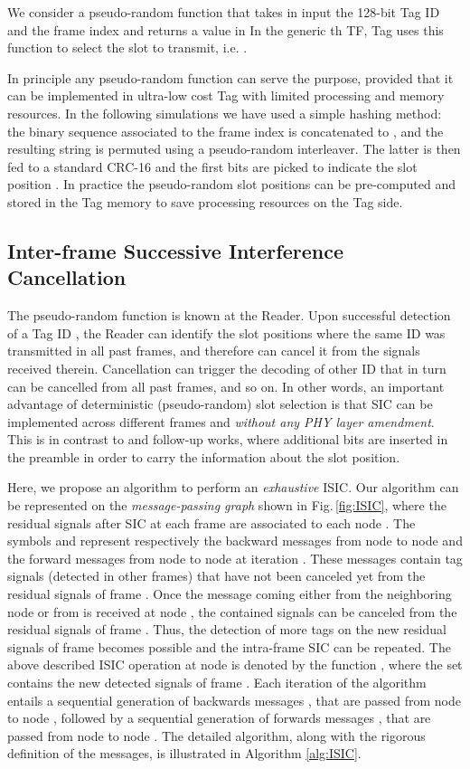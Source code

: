 \documentclass[12pt,draftcls,onecolumn]{IEEEtran}
\begin{document}
We consider a pseudo-random function 
 that takes in input the 128-bit Tag ID and the frame index  and returns a value in  In the generic th TF,  Tag  uses this function to select the slot to transmit, i.e. .




In principle any pseudo-random function can serve the purpose, provided that it can be implemented in ultra-low cost Tag with limited processing and memory resources.
In the following simulations we have used a simple hashing method: the binary sequence associated to the frame index  is concatenated to , and the resulting string is permuted using a pseudo-random interleaver. The latter is then fed to a standard CRC-16 and the first   bits are picked to indicate the slot position . {In practice the pseudo-random slot positions can be pre-computed and stored in the Tag memory to save processing resources on the Tag side.}


\subsection{Inter-frame Successive Interference Cancellation}\label{sec:isic}

The pseudo-random function  is known at the Reader.
Upon successful detection of a Tag ID , the Reader can identify the slot positions where the same ID was transmitted in all past frames, and therefore can cancel it from the signals received therein. Cancellation can trigger the decoding of other ID that in turn can be cancelled from all past frames, and so on.
In other words, an important  advantage of deterministic (pseudo-random) slot selection is that SIC can be implemented  across different frames and \emph{without any PHY layer amendment}. This is in contrast to \cite{cassini07} and follow-up works, where additional bits are inserted in the preamble in order to carry the information about the slot position.

 Here, we propose an algorithm to perform an \emph{exhaustive} ISIC. Our algorithm  can be represented on the \emph{message-passing graph} shown in Fig.\,\ref{fig:ISIC}, where the residual signals after SIC at each frame  are associated to each node . The symbols  and  represent respectively the backward messages from node  to node  and the forward messages from node  to node  at iteration . These messages contain tag signals (detected in other frames) that have not been canceled yet from the residual signals of frame . Once the message coming either from the neighboring node  or from  is received at node , the contained signals can be canceled from the residual signals of frame . Thus, the detection of more tags on the new residual signals of frame  becomes possible and the intra-frame SIC can be repeated. The above described ISIC operation at node  is denoted by the function
,
where the set  contains the new detected signals of frame . Each iteration of the algorithm  entails a sequential generation of backwards messages  , that are passed from node  to node , followed by a sequential generation of forwards messages , that are passed from node  to node . The detailed algorithm, along with the rigorous definition of the messages, is illustrated in Algorithm \ref{alg:ISIC}.
\end{document}
